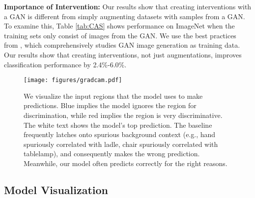 \documentclass[final]{cvpr}
\begin{document}
\textbf{Importance of Intervention:}
Our results show that creating interventions with a GAN is different from simply augmenting datasets with samples from a GAN. To examine this,
Table \ref{tab:CAS} shows performance on ImageNet when the training sets only consist of images from the GAN. We use the best practices from \cite{CAS}, which comprehensively studies GAN image generation as training data. Our results show that creating interventions, not just augmentations, improves classification performance by 2.4\%-6.0\%.















































\begin{figure}[t]
  \centering
      \vspace{-5mm}
  \texttt{[image: figures/gradcam.pdf]}
\caption{We visualize the input regions that the model uses to make predictions. Blue implies the model ignores the region for discrimination, while red implies the region is very discriminative. The white text shows the model's top prediction. The baseline frequently latches onto spurious background context (e.g., hand spuriously correlated with ladle, chair spuriously correlated with tablelamp), and consequently makes the wrong prediction. Meanwhile, our model often predicts correctly for the right reasons.}
\label{fig:gradcam}
      \vspace{-5mm}
\end{figure}
\subsection{Model Visualization}
\end{document}
